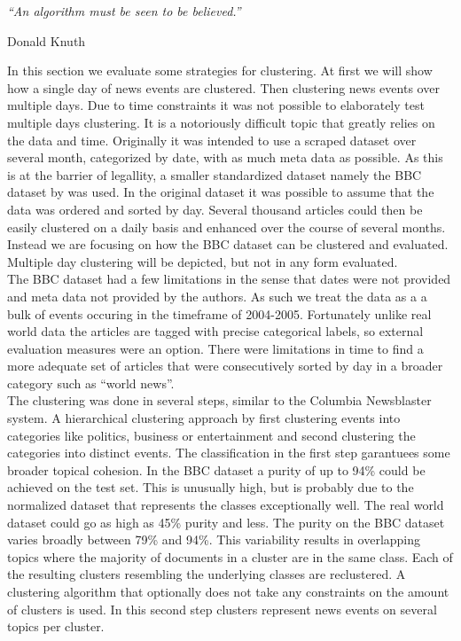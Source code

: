 \epigraph{\emph{
  ``An algorithm must be seen to be believed.''
}}{ Donald Knuth }

In this section we evaluate some strategies for clustering. At first we will show how a single day of news events are clustered. Then clustering news events over multiple days. Due to time constraints it was not possible to elaborately test multiple days clustering. It is a notoriously difficult topic that greatly relies on the data and time. Originally it was intended to use a scraped dataset over several month, categorized by date, with as much meta data as possible. As this is at the barrier of legallity, a smaller standardized dataset namely the BBC dataset by \cite{BBCData2006} was used. In the original dataset it was possible to assume that the data was ordered and sorted by day. Several thousand articles could then be easily clustered on a daily basis and enhanced over the course of several months. Instead we are focusing on how the BBC dataset can be clustered and evaluated. Multiple day clustering will be depicted, but not in any form evaluated.\\

The BBC dataset had a few limitations in the sense that dates were not provided and meta data not provided by the authors. As such we treat the data as a a bulk of events occuring in the timeframe of 2004-2005. Fortunately unlike real world data the articles are tagged with precise categorical labels, so external evaluation measures were an option. There were limitations in time to find a more adequate set of articles that were consecutively sorted by day in a broader category such as ``world news''.\\

The clustering was done in several steps, similar to the Columbia Newsblaster system.\cite[Columbia stuff]{Nothing} A hierarchical clustering approach by first clustering events into categories like politics, business or entertainment and second clustering the categories into distinct events. The classification in the first step garantuees some broader topical cohesion. In the BBC dataset a purity of up to 94\% could be achieved on the test set. This is unusually high, but is probably due to the normalized dataset that represents the classes exceptionally well. The real world dataset could go as high as 45\% purity and less. \cite[some other evaluation here]{Nothing} The purity on the BBC dataset varies broadly between 79\% and 94\%. This variability results in overlapping topics where the majority of documents in a cluster are in the same class. Each of the resulting clusters resembling the underlying classes are reclustered. A clustering algorithm that optionally does not take any constraints on the amount of clusters is used. In this second step clusters represent news events on several topics per cluster.\\

